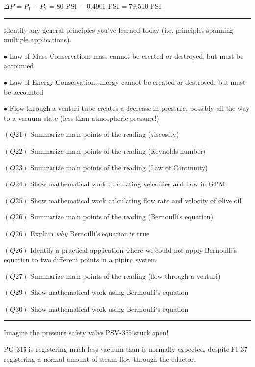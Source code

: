 $\Delta P$ = $P_1 - P_2$ = 80 PSI $-$ 0.4901 PSI = 79.510 PSI


\filbreak \vskip 5pt \hrule \vskip 5pt  \vskip 10pt

\noindent
Identify any general principles you've learned today (i.e. principles spanning multiple applications).
\item{$\bullet$} Law of Mass Conservation: mass cannot be created or destroyed, but must be accounted
\item{$\bullet$} Law of Energy Conservation: energy cannot be created or destroyed, but must be accounted
\item{$\bullet$} Flow through a venturi tube creates a decrease in pressure, possibly all the way to a vacuum state (less than atmospheric pressure!)
\medskip

\medskip
\item{$(Q21)$} Summarize main points of the reading (viscosity)
\item{$(Q22)$} Summarize main points of the reading (Reynolds number)
\item{$(Q23)$} Summarize main points of the reading (Law of Continuity)
\item{$(Q24)$} Show mathematical work calculating velocities and flow in GPM
\item{$(Q25)$} Show mathematical work calculating flow rate and velocity of olive oil
\item{$(Q26)$} Summarize main points of the reading (Bernoulli's equation)
\item{$(Q26)$} Explain {\it why} Bernoilli's equation is true
\item{$(Q26)$} Identify a practical application where we could not apply Bernoulli's equation to two different points in a piping system
\item{$(Q27)$} Summarize main points of the reading (flow through a venturi)
\medskip

\medskip
\item{$(Q29)$} Show mathematical work using Bermoulli's equation
\item{$(Q30)$} Show mathematical work using Bermoulli's equation
\medskip


\filbreak \vskip 5pt \hrule \vskip 5pt  \vskip 10pt

Imagine the pressure safety valve PSV-355 stuck open!

\vskip 10pt

PG-316 is registering much less vacuum than is normally expected, despite FI-37 registering a normal amount of steam flow through the eductor.



\bye



